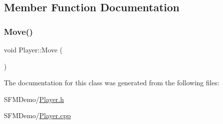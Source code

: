 \subsection{Member Function Documentation}
\hypertarget{class_player_a8746f750b36da18dff7a34da2e04b2eb}{}\label{class_player_a8746f750b36da18dff7a34da2e04b2eb} 
\subsubsection{\texorpdfstring{Move()}{Move()}}
{\footnotesize\ttfamily void Player\+::\+Move (\begin{DoxyParamCaption}{ }\end{DoxyParamCaption})}



The documentation for this class was generated from the following files\+:\begin{DoxyCompactItemize}
\item 
S\+F\+M\+Demo/\hyperlink{_player_8h}{Player.\+h}\item 
S\+F\+M\+Demo/\hyperlink{_player_8cpp}{Player.\+cpp}\end{DoxyCompactItemize}

